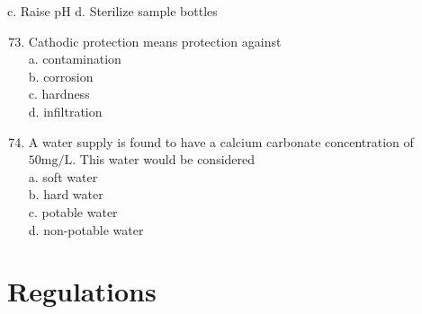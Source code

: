 \documentclass[10pt]{article}
\begin{document}
c. Raise pH d. Sterilize sample bottles

\begin{enumerate}
  \setcounter{enumi}{72}
  \item Cathodic protection means protection against\\
a. contamination\\
b. corrosion\\
c. hardness\\
d. infiltration\\

  \item A water supply is found to have a calcium carbonate concentration of $50 \mathrm{mg} / \mathrm{L}$. This water would be considered\\
a. soft water\\
b. hard water\\
c. potable water\\
d. non-potable water\\

\end{enumerate}

\newpage
\section{Regulations}
\end{document}
